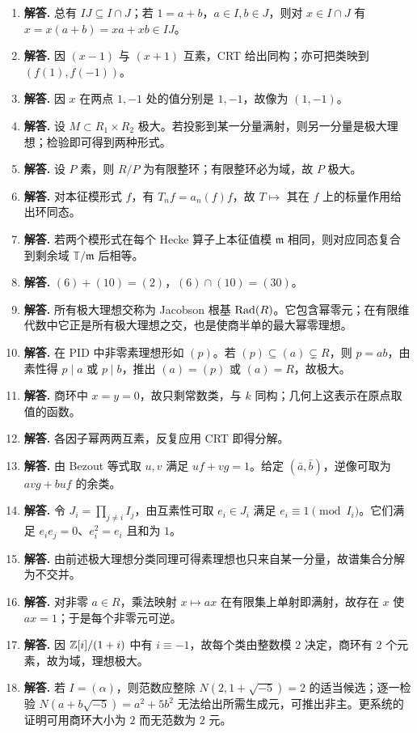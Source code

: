 \begin{enumerate}[label=\textbf{\arabic*.}, leftmargin=*, itemsep=1em]
\item \textbf{解答.} 总有 $IJ\subseteq I\cap J$；若 $1=a+b$，$a\in I,b\in J$，则对 $x\in I\cap J$ 有 $x=x(a+b)=xa+xb\in IJ$。
\item \textbf{解答.} 因 $(x-1)$ 与 $(x+1)$ 互素，CRT 给出同构；亦可把类映到 $(f(1),f(-1))$。
\item \textbf{解答.} 因 $x$ 在两点 $1,-1$ 处的值分别是 $1,-1$，故像为 $(1,-1)$。
\item \textbf{解答.} 设 $M\subset R_1\times R_2$ 极大。若投影到某一分量满射，则另一分量是极大理想；检验即可得到两种形式。
\item \textbf{解答.} 设 $P$ 素，则 $R/P$ 为有限整环；有限整环必为域，故 $P$ 极大。
\item \textbf{解答.} 对本征模形式 $f$，有 $T_nf=a_n(f)f$，故 $T\mapsto$ 其在 $f$ 上的标量作用给出环同态。
\item \textbf{解答.} 若两个模形式在每个 Hecke 算子上本征值模 $\mathfrak m$ 相同，则对应同态复合到剩余域 $\mathbb{T}/\mathfrak m$ 后相等。
\item \textbf{解答.} $(6)+(10)=(2)$，$(6)\cap(10)=(30)$。
\item \textbf{解答.} 所有极大理想交称为 Jacobson 根基 $\operatorname{Rad}(R)$。它包含幂零元；在有限维代数中它正是所有极大理想之交，也是使商半单的最大幂零理想。
\item \textbf{解答.} 在 PID 中非零素理想形如 $(p)$。若 $(p)\subseteq (a)\subsetneq R$，则 $p=ab$，由素性得 $p\mid a$ 或 $p\mid b$，推出 $(a)=(p)$ 或 $(a)=R$，故极大。
\item \textbf{解答.} 商环中 $x=y=0$，故只剩常数类，与 $k$ 同构；几何上这表示在原点取值的函数。
\item \textbf{解答.} 各因子幂两两互素，反复应用 CRT 即得分解。
\item \textbf{解答.} 由 Bezout 等式取 $u,v$ 满足 $uf+vg=1$。给定 $(\bar a,\bar b)$，逆像可取为 $av g+b u f$ 的余类。
\item \textbf{解答.} 令 $J_i=\prod_{j\ne i} I_j$，由互素性可取 $e_i\in J_i$ 满足 $e_i\equiv1\pmod{I_i}$。它们满足 $e_ie_j=0$、$e_i^2=e_i$ 且和为 $1$。
\item \textbf{解答.} 由前述极大理想分类同理可得素理想也只来自某一分量，故谱集合分解为不交并。
\item \textbf{解答.} 对非零 $a\in R$，乘法映射 $x\mapsto ax$ 在有限集上单射即满射，故存在 $x$ 使 $ax=1$；于是每个非零元可逆。
\item \textbf{解答.} 因 $\mathbb{Z}[i]/(1+i)$ 中有 $i\equiv -1$，故每个类由整数模 $2$ 决定，商环有 $2$ 个元素，故为域，理想极大。
\item \textbf{解答.} 若 $I=(\alpha)$，则范数应整除 $N(2,1+\sqrt{-5})=2$ 的适当候选；逐一检验 $N(a+b\sqrt{-5})=a^2+5b^2$ 无法给出所需生成元，可推出非主。更系统的证明可用商环大小为 $2$ 而无范数为 $2$ 元。

\end{enumerate}
